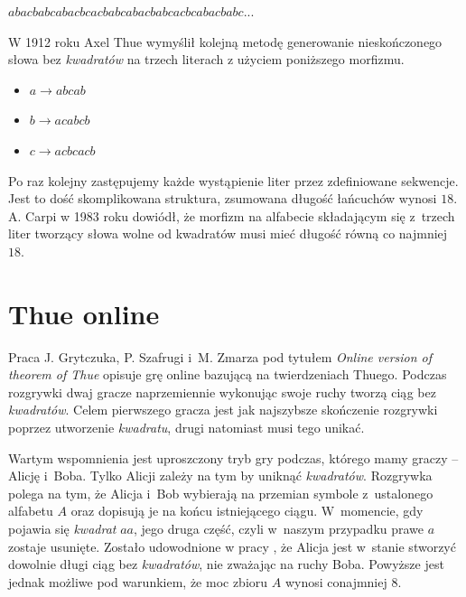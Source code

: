 \documentclass[document]{xmgr}
\begin{document}
{\centering $abacbabcabacbcacbabcabacbabcacbcabacbabc...$ \par}

W 1912 roku Axel Thue wymyślił kolejną metodę generowanie nieskończonego słowa bez \emph{kwadratów} na trzech literach z użyciem poniższego morfizmu. 
\begin{itemize}
\item $a \to abcab$
\item $b \to acabcb$
\item $c \to acbcacb$
\end{itemize}


\noindent Po raz kolejny zastępujemy każde wystąpienie liter przez zdefiniowane sekwencje. Jest to dość skomplikowana struktura, zsumowana długość łańcuchów wynosi $18$. A. Carpi \cite{carpi} w 1983 roku dowiódł, że morfizm na alfabecie składającym się z~trzech liter tworzący słowa wolne od kwadratów musi mieć długość równą co najmniej $18$.

\section{Thue online}
Praca J. Grytczuka, P. Szafrugi i~M. Zmarza pod tytułem \emph{Online version of theorem of Thue} \cite{thueonline} opisuje grę online bazującą na twierdzeniach Thuego. Podczas rozgrywki dwaj gracze  naprzemiennie wykonując swoje ruchy tworzą  ciąg bez \emph{kwadratów}. Celem pierwszego gracza jest jak najszybsze skończenie rozgrywki poprzez utworzenie \emph{kwadratu}, drugi natomiast musi tego unikać.

Wartym wspomnienia jest uproszczony tryb gry podczas, którego mamy graczy -- Alicję i~Boba. Tylko Alicji zależy na tym by uniknąć \emph{kwadratów}. Rozgrywka polega na tym, że Alicja i~Bob wybierają na przemian symbole z~ustalonego alfabetu $A$ oraz dopisują je na końcu istniejącego ciągu. W~momencie, gdy pojawia się \emph{kwadrat} $aa$, jego druga część, czyli w~naszym przypadku prawe $a$ zostaje usunięte. Zostało udowodnione w pracy \cite{thueonline2}, że Alicja jest w~stanie stworzyć dowolnie długi ciąg bez \emph{kwadratów}, nie zważając na ruchy Boba. Powyższe jest jednak możliwe pod warunkiem, że moc zbioru $A$ wynosi conajmniej $8$.
\end{document}

